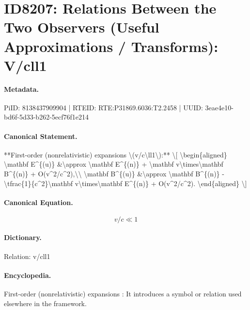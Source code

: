 \section*{ID8207: Relations Between the Two Observers (Useful Approximations / Transforms): V/cll1}
\paragraph{Metadata.}
PiID: 8138437909904 | RTEID: RTE:P31869.6036:T2.2458 | UUID: 3eae4e10-bd6f-5d33-b262-5ecf76f1e214

\paragraph{Canonical Statement.}
**First-order (nonrelativistic) expansions \textbackslash{}(v/c\textbackslash{}ll1\textbackslash{}):** \textbackslash{}[ \textbackslash{}begin\{aligned\} \textbackslash{}mathbf E\textasciicircum{}\{(u)\} \&\textbackslash{}approx \textbackslash{}mathbf E\textasciicircum{}\{(n)\} + \textbackslash{}mathbf v\textbackslash{}times\textbackslash{}mathbf B\textasciicircum{}\{(n)\} + O(v\textasciicircum{}2/c\textasciicircum{}2),\textbackslash{}\textbackslash{} \textbackslash{}mathbf B\textasciicircum{}\{(u)\} \&\textbackslash{}approx \textbackslash{}mathbf B\textasciicircum{}\{(n)\} - \textbackslash{}tfrac\{1\}\{c\textasciicircum{}2\}\textbackslash{}mathbf v\textbackslash{}times\textbackslash{}mathbf E\textasciicircum{}\{(n)\} + O(v\textasciicircum{}2/c\textasciicircum{}2). \textbackslash{}end\{aligned\} \textbackslash{}]

\paragraph{Canonical Equation.}
\[
v/c\ll1
\]

\paragraph{Dictionary.}
Relation: v/cll1

\paragraph{Encyclopedia.}
First-order (nonrelativistic) expansions : It introduces a symbol or relation used elsewhere in the framework.
